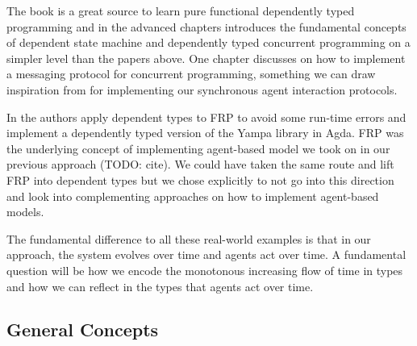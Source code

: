 The book \cite{brady_type-driven_2017} is a great source to learn pure functional dependently typed programming and in the advanced chapters introduces the fundamental concepts of dependent state machine and dependently typed concurrent programming on a simpler level than the papers above. One chapter discusses on how to implement a messaging protocol for concurrent programming, something we can draw inspiration from for implementing our synchronous agent interaction protocols.

In \cite{sculthorpe_safe_2009} the authors apply dependent types to FRP to avoid some run-time errors and implement a dependently typed version of the Yampa library in Agda. FRP was the underlying concept of implementing agent-based model we took on in our previous approach (TODO: cite). We could have taken the same route and lift FRP into dependent types but we chose explicitly to not go into this direction and look into complementing approaches on how to implement agent-based models.

The fundamental difference to all these real-world examples is that in our approach, the system evolves over time and agents act over time. A fundamental question will be how we encode the monotonous increasing flow of time in types and how we can reflect in the types that agents act over time.



\subsection{General Concepts}
\label{sub:dep_abs_generalconcepts}

